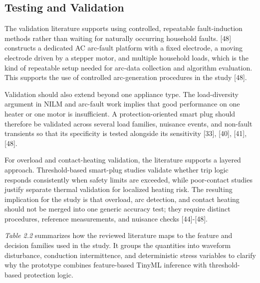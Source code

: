 \subsection{Testing and Validation}\label{testing-and-validation}

The validation literature supports using controlled, repeatable
fault-induction methods rather than waiting for naturally occurring
household faults. {[}48{]} constructs a dedicated AC arc-fault platform
with a fixed electrode, a moving electrode driven by a stepper motor,
and multiple household loads, which is the kind of repeatable setup
needed for arc-data collection and algorithm evaluation. This supports
the use of controlled arc-generation procedures in the study {[}48{]}.

Validation should also extend beyond one appliance type. The
load-diversity argument in NILM and arc-fault work implies that good
performance on one heater or one motor is insufficient. A
protection-oriented smart plug should therefore be validated across
several load families, nuisance events, and non-fault transients so that
its specificity is tested alongside its sensitivity {[}33{]}, {[}40{]},
{[}41{]}, {[}48{]}.

For overload and contact-heating validation, the literature supports a
layered approach. Threshold-based smart-plug studies validate whether
trip logic responds consistently when safety limits are exceeded, while
poor-contact studies justify separate thermal validation for localized
heating risk. The resulting implication for the study is that overload,
arc detection, and contact heating should not be merged into one generic
accuracy test; they require distinct procedures, reference measurements,
and nuisance checks {[}44{]}-{[}48{]}.

\textit{Table 2.2} summarizes how the reviewed literature maps to the feature and
decision families used in the study. It groups the quantities into
waveform disturbance, conduction intermittence, and deterministic stress
variables to clarify why the prototype combines feature-based TinyML
inference with threshold-based protection logic.

